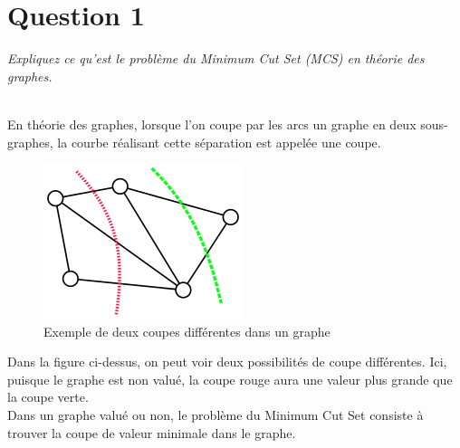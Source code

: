 \section{Question 1}
\textit{Expliquez ce qu'est le problème du Minimum Cut Set (MCS) en théorie des graphes.}\\~\\\par
En théorie des graphes, lorsque l’on coupe par les arcs un graphe en deux sous-graphes, la courbe réalisant cette séparation est appelée une coupe.
\begin{figure}[H]
 \centering
 \includegraphics[width=.4\textwidth]{img/graph.png}
 \caption{Exemple de deux coupes différentes dans un graphe}
\end{figure}

Dans la figure ci-dessus, on peut voir deux possibilités de coupe différentes. Ici, puisque le graphe est non valué, la coupe rouge aura une valeur plus grande que la coupe verte.\\
Dans un graphe valué ou non, le problème du Minimum Cut Set consiste à trouver la coupe de valeur minimale dans le graphe. 